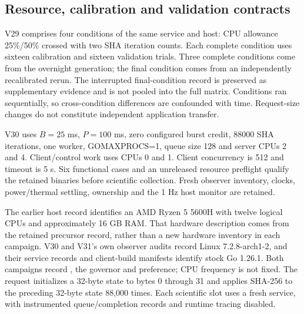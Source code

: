 \documentclass[11pt,a4paper]{article}
\begin{document}
\subsection{Resource, calibration and validation contracts}

V29 comprises four conditions of the same service and host: CPU allowance
25\%/50\% crossed with two SHA iteration counts. Each complete condition uses
sixteen calibration and sixteen validation trials. Three complete conditions
come from the overnight generation; the final condition comes from an
independently recalibrated rerun. The interrupted final-condition record is
preserved as supplementary evidence and is not pooled into the full matrix.
Conditions ran sequentially, so cross-condition differences are confounded
with time. Request-size changes do not constitute independent application
transfer.

V30 uses $B=25$ ms, $P=100$ ms, zero configured burst credit, 88000 SHA iterations,
one worker, GOMAXPROCS=1, queue size 128 and server CPUs 2 and 4. Client/control
work uses CPUs 0 and 1. Client concurrency is 512 and timeout is 5 s. Six
functional cases and an unreleased resource preflight qualify the retained
binaries before scientific collection. Fresh observer inventory, clocks,
power/thermal settling, ownership and the 1 Hz host monitor are retained.

The earlier host record identifies an AMD Ryzen 5 5600H with twelve logical
CPUs and approximately 16 GB RAM. That hardware description comes from the
retained precursor record, rather than a new hardware inventory in each
campaign. V30 and V31's own observer audits record Linux 7.2.8-arch1-2, and
their service records and client-build manifests identify stock Go 1.26.1.
Both campaigns record , the  governor and
 preference; CPU frequency is not fixed. The request
initializes a 32-byte state to bytes 0 through 31 and applies SHA-256 to the
preceding 32-byte state 88,000 times. Each scientific slot uses a fresh service,
with instrumented queue/completion records and runtime tracing disabled.
\end{document}
